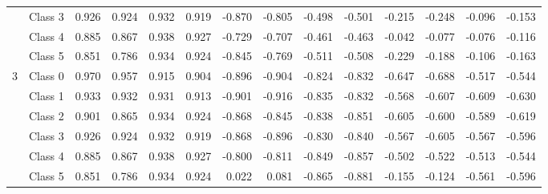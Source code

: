 \begin{table*}[t]
\begin{tabular}{l|l|rrrr|rrrr|rrrr}
&Class 3 & 0.926 & 0.924 & 0.932 & 0.919 & -0.870 & -0.805 & -0.498 & -0.501 & -0.215 & -0.248 & -0.096 & -0.153 \\
&Class 4 & 0.885 & 0.867 & 0.938 & 0.927 & -0.729 & -0.707 & -0.461 & -0.463 & -0.042 & -0.077 & -0.076 & -0.116 \\
&Class 5 & 0.851 & 0.786 & 0.934 & 0.924 & -0.845 & -0.769 & -0.511 & -0.508 & -0.229 & -0.188 & -0.106 & -0.163 \\
\midrule
\multirow{6}{*}{3} 
&Class 0 & 0.970 & 0.957 & 0.915 & 0.904 & -0.896 & -0.904 & -0.824 & -0.832 & -0.647 & -0.688 & -0.517 & -0.544 \\
&Class 1 & 0.933 & 0.932 & 0.931 & 0.913 & -0.901 & -0.916 & -0.835 & -0.832 & -0.568 & -0.607 & -0.609 & -0.630 \\
&Class 2 & 0.901 & 0.865 & 0.934 & 0.924 & -0.868 & -0.845 & -0.838 & -0.851 & -0.605 & -0.600 & -0.589 & -0.619 \\
&Class 3 & 0.926 & 0.924 & 0.932 & 0.919 & -0.868 & -0.896 & -0.830 & -0.840 & -0.567 & -0.605 & -0.567 & -0.596 \\
&Class 4 & 0.885 & 0.867 & 0.938 & 0.927 & -0.800 & -0.811 & -0.849 & -0.857 & -0.502 & -0.522 & -0.513 & -0.544 \\
&Class 5 & 0.851 & 0.786 & 0.934 & 0.924 & 0.022 & 0.081 & -0.865 & -0.881 & -0.155 & -0.124 & -0.561 & -0.596 \\


\end{tabular}
\end{table*}
